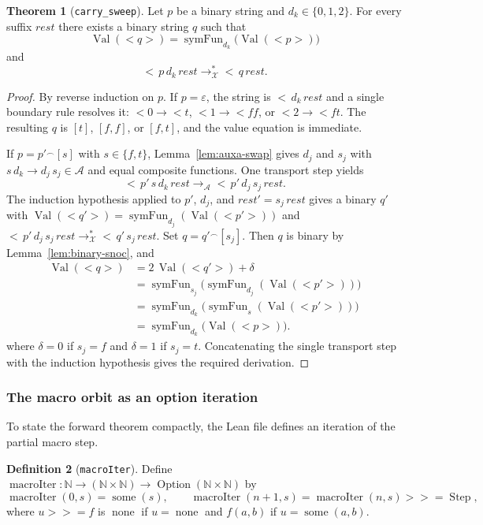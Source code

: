\documentclass[11pt,a4paper]{article}
\theoremstyle{definition}
\newtheorem{definition}{Definition}[section]
\newtheorem{theorem}[definition]{Theorem}
\newcommand{\lt}{<}
\newcommand{\gt}{>}
\newcommand{\Nat}{\mathbb{N}}
\newcommand{\val}{\operatorname{Val}}
\newcommand{\conc}{{^\frown}}
\newcommand{\symfun}{\operatorname{symFun}}
\newcommand{\auxA}{\mathcal{A}}
\newcommand{\auxRules}{\mathcal{X}}
\newcommand{\macroStep}{\operatorname{Step}}
\newcommand{\some}{\operatorname{some}}
\newcommand{\none}{\operatorname{none}}
\newcommand{\macroIter}{\operatorname{macroIter}}
\newcommand{\Option}{\operatorname{Option}}
\newcommand{\bind}{\mathbin{>\!\!\!>\!=}}
\begin{document}
\begin{theorem}[\texttt{carry\_sweep}]
\label{thm:carry-sweep}
Let $p$ be a binary string and $d_k\in\{0,1,2\}$.  For every suffix
$\textit{rest}$ there exists a binary string $q$ such that
\[
  \val(\lt q\gt)=\symfun_{d_k}\bigl(\val(\lt p\gt)\bigr)
\]
and
\[
  \lt\,p\,d_k\,\textit{rest}
  \to^{*}_{\auxRules}
  \lt\,q\,\textit{rest}.
\]
\end{theorem}
\begin{proof}
By reverse induction on $p$.  If $p=\varepsilon$, the string is
$\lt\,d_k\,\textit{rest}$ and a single boundary rule resolves it:
$\lt 0\to\lt t$, $\lt 1\to\lt ff$, or $\lt 2\to\lt ft$.  The resulting $q$
is $[t]$, $[f,f]$, or $[f,t]$, and the value equation is immediate.

If $p=p'\conc[s]$ with $s\in\{f,t\}$, Lemma~\ref{lem:auxa-swap} gives
$d_j$ and $s_j$ with $s\,d_k\to d_j\,s_j\in\auxA$ and equal composite
functions.  One transport step yields
\[
  \lt\,p'\,s\,d_k\,\textit{rest}
  \to_{\auxA}
  \lt\,p'\,d_j\,s_j\,\textit{rest}.
\]
The induction hypothesis applied to $p'$, $d_j$, and
$\textit{rest}'=s_j\,\textit{rest}$ gives a binary $q'$ with
$\val(\lt q'\gt)=\symfun_{d_j}(\val(\lt p'\gt))$ and
$\lt\,p'\,d_j\,s_j\,\textit{rest}\to^{*}_{\auxRules}\lt\,q'\,s_j\,\textit{rest}$.
Set $q=q'\conc[s_j]$.  Then $q$ is binary by
Lemma~\ref{lem:binary-snoc}, and
\[
  \begin{aligned}
  \val(\lt q\gt)
  &=2\,\val(\lt q'\gt)+\delta\\
  &=\symfun_{s_j}\bigl(\symfun_{d_j}(\val(\lt p'\gt))\bigr)\\
  &=\symfun_{d_k}\bigl(\symfun_s(\val(\lt p'\gt))\bigr)\\
  &=\symfun_{d_k}\bigl(\val(\lt p\gt)\bigr).
  \end{aligned}
\]
where $\delta=0$ if $s_j=f$ and $\delta=1$ if $s_j=t$.  Concatenating the
single transport step with the induction hypothesis gives the required
derivation.
\end{proof}

\subsubsection{The macro orbit as an option iteration}

To state the forward theorem compactly, the Lean file defines an
iteration of the partial macro step.

\begin{definition}[\texttt{macroIter}]
Define $\macroIter:\Nat\to(\Nat\times\Nat)\to\Option(\Nat\times\Nat)$
by
\[
  \macroIter(0,s)=\some(s),
  \qquad
  \macroIter(n+1,s)=\macroIter(n,s)\bind\macroStep,
\]
where $u\bind f$ is $\none$ if $u=\none$ and $f(a,b)$ if $u=\some(a,b)$.
\end{definition}
\end{document}

